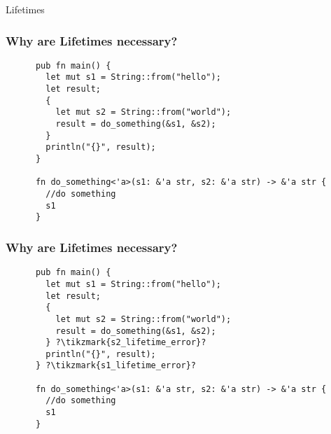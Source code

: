 \begin{section}{Lifetimes}
    \begin{frame}[fragile]
    \frametitle{Why are Lifetimes necessary?}
    \begin{verbatim}
      pub fn main() {
        let mut s1 = String::from("hello");
        let result;
        {
          let mut s2 = String::from("world");
          result = do_something(&s1, &s2);
        }
        println("{}", result);
      }

      fn do_something<'a>(s1: &'a str, s2: &'a str) -> &'a str {
        //do something
        s1
      }
    \end{verbatim}
  \end{frame}

  \begin{frame}[fragile]
    \frametitle{Why are Lifetimes necessary?}
    \begin{verbatim}
      pub fn main() {
        let mut s1 = String::from("hello");
        let result;
        {
          let mut s2 = String::from("world");
          result = do_something(&s1, &s2);
        } ?\tikzmark{s2_lifetime_error}?
        println("{}", result);
      } ?\tikzmark{s1_lifetime_error}?

      fn do_something<'a>(s1: &'a str, s2: &'a str) -> &'a str {
        //do something
        s1
      }
    \end{verbatim}
  \end{frame}

\end{section}
